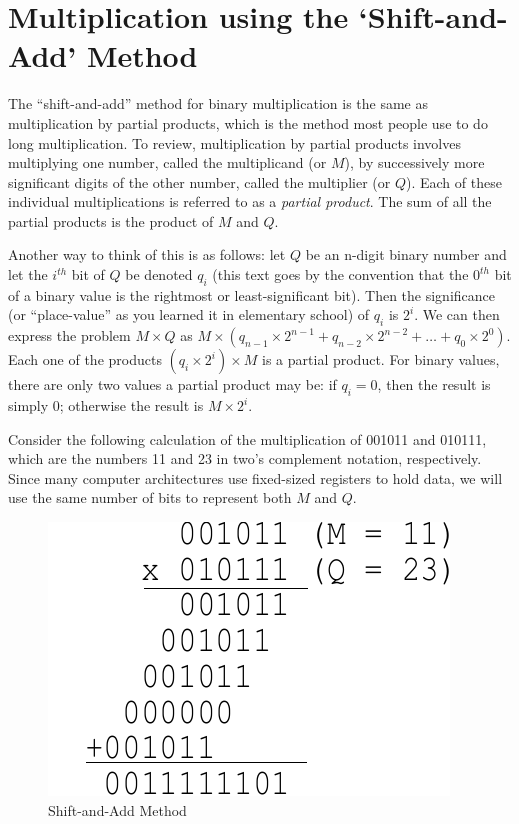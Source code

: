 \documentclass{article}
\begin{document}
\section{Multiplication using the `Shift-and-Add' Method}
The ``shift-and-add'' method for binary multiplication is the same as multiplication by partial products, which is the method most people use to do long multiplication.
To review, multiplication by partial products involves multiplying one number, called the multiplicand (or $M$), by successively more significant digits of the other number, called the multiplier (or $Q$).%
Each of these individual multiplications is referred to as a \textsl{partial product}.
The sum of all the partial products is the product of $M$ and $Q$.



Another way to think of this is as follows: let $Q$ be an n-digit binary number and let the $i^{th}$ bit of $Q$ be denoted $q_i$ (this text goes by the convention that the $0^{th}$ bit of a binary value is the rightmost or least-significant bit).
Then the significance (or ``place-value'' as you learned it in elementary school) of $q_i$ is $2^i$.
We can then express the problem $M \times Q$ as $M \times (q_{n-1} \times 2^{n-1} + q_{n-2} \times 2^{n-2} + \ldots + q_{0} \times 2^{0})$.
Each one of the products $(q_i \times 2^{i}) \times M$ is a partial product.
For binary values, there are only two values a partial product may be: if $q_i = 0$, then the result is simply $0$; otherwise the result is $M \times 2^i$.

Consider the following calculation of the multiplication of 001011 and 010111, which are the numbers 11 and 23 in two's complement notation, respectively.
Since many computer architectures use fixed-sized registers to hold data, we will use the same number of bits to represent both $M$ and $Q$.

\begin{figure}[h]
\centering
\includegraphics[scale=0.7]{saam3.pdf}
\caption{Shift-and-Add Method}
\end{figure}
\end{document}
